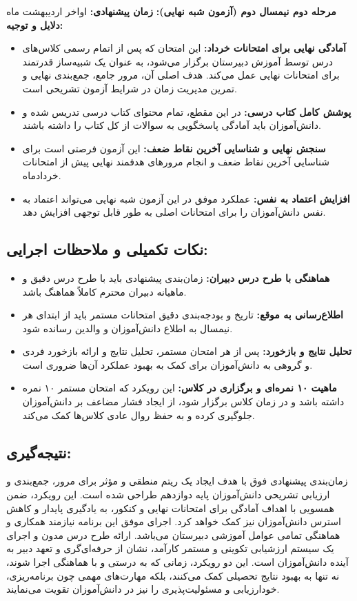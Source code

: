\documentclass[a4paper]{article}
\begin{document}
\textbf{مرحله دوم نیمسال دوم (آزمون شبه نهایی):}
\newline\textbf{زمان پیشنهادی:} اواخر اردیبهشت ماه
\newline\textbf{دلایل و توجیه:}
\begin{itemize}
    \item \textbf{آمادگی نهایی برای امتحانات خرداد:} این امتحان که پس از اتمام رسمی کلاس‌های درس توسط آموزش دبیرستان برگزار می‌شود، به عنوان یک شبیه‌ساز قدرتمند برای امتحانات نهایی عمل می‌کند. هدف اصلی آن، مرور جامع، جمع‌بندی نهایی و تمرین مدیریت زمان در شرایط آزمون تشریحی است.
    \item \textbf{پوشش کامل کتاب درسی:} در این مقطع، تمام محتوای کتاب درسی تدریس شده و دانش‌آموزان باید آمادگی پاسخگویی به سوالات از کل کتاب را داشته باشند.
    \item \textbf{سنجش نهایی و شناسایی آخرین نقاط ضعف:} این آزمون فرصتی است برای شناسایی آخرین نقاط ضعف و انجام مرورهای هدفمند نهایی پیش از امتحانات خردادماه.
    \item \textbf{افزایش اعتماد به نفس:} عملکرد موفق در این آزمون شبه نهایی می‌تواند اعتماد به نفس دانش‌آموزان را برای امتحانات اصلی به طور قابل توجهی افزایش دهد.
\end{itemize}
\bigskip
\subsection*{نکات تکمیلی و ملاحظات اجرایی:}
\begin{itemize}
    \item \textbf{هماهنگی با طرح درس دبیران:} زمان‌بندی پیشنهادی باید با طرح درس دقیق و ماهیانه دبیران محترم کاملاً هماهنگ باشد.
    \item \textbf{اطلاع‌رسانی به موقع:} تاریخ و بودجه‌بندی دقیق امتحانات مستمر باید از ابتدای هر نیمسال به اطلاع دانش‌آموزان و والدین رسانده شود.
    \item \textbf{تحلیل نتایج و بازخورد:} پس از هر امتحان مستمر، تحلیل نتایج و ارائه بازخورد فردی و گروهی به دانش‌آموزان برای کمک به بهبود عملکرد آن‌ها ضروری است.
    \item \textbf{ماهیت ۱۰ نمره‌ای و برگزاری در کلاس:} این رویکرد که امتحان مستمر ۱۰ نمره داشته باشد و در زمان کلاس برگزار شود، از ایجاد فشار مضاعف بر دانش‌آموزان جلوگیری کرده و به حفظ روال عادی کلاس‌ها کمک می‌کند.
\end{itemize}
\bigskip

\subsection*{نتیجه‌گیری:}
زمان‌بندی پیشنهادی فوق با هدف ایجاد یک ریتم منطقی و مؤثر برای مرور، جمع‌بندی و ارزیابی تشریحی دانش‌آموزان پایه دوازدهم طراحی شده است. این رویکرد، ضمن همسویی با اهداف آمادگی برای امتحانات نهایی و کنکور، به یادگیری پایدار و کاهش استرس دانش‌آموزان نیز کمک خواهد کرد. اجرای موفق این برنامه نیازمند همکاری و هماهنگی تمامی عوامل آموزشی دبیرستان می‌باشد.
\bigskip
ارائه طرح درس مدون و اجرای یک سیستم ارزشیابی تکوینی و مستمر کارآمد، نشان از حرفه‌ای‌گری و تعهد دبیر به آینده دانش‌آموزان است. این دو رویکرد، زمانی که به درستی و با هماهنگی اجرا شوند، نه تنها به بهبود نتایج تحصیلی کمک می‌کنند، بلکه مهارت‌های مهمی چون برنامه‌ریزی، خودارزیابی و مسئولیت‌پذیری را نیز در دانش‌آموزان تقویت می‌نمایند.
\newpage
\end{document}
